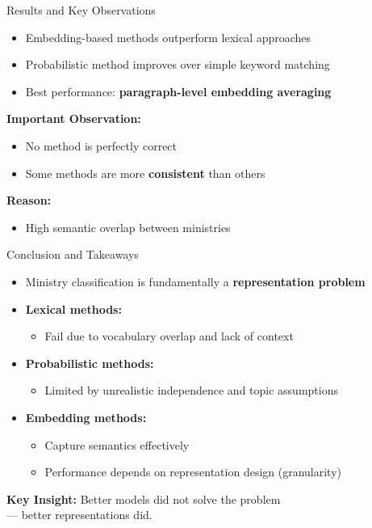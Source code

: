 \documentclass{beamer}
\begin{document}
\begin{frame}{Results and Key Observations}
\begin{itemize}
    \item Embedding-based methods outperform lexical approaches
    \item Probabilistic method improves over simple keyword matching
    \item Best performance: \textbf{paragraph-level embedding averaging}
\end{itemize}

\vspace{0.5em}

\textbf{Important Observation:}
\begin{itemize}
    \item No method is perfectly correct
    \item Some methods are more \textbf{consistent} than others
\end{itemize}

\vspace{0.5em}

\textbf{Reason:}
\begin{itemize}
    \item High semantic overlap between ministries
\end{itemize}
\end{frame}

\begin{frame}{Conclusion and Takeaways}
\begin{itemize}
    \item Ministry classification is fundamentally a \textbf{representation problem}
    
    \item \textbf{Lexical methods:}
    \begin{itemize}
        \item Fail due to vocabulary overlap and lack of context
    \end{itemize}
    
    \item \textbf{Probabilistic methods:}
    \begin{itemize}
        \item Limited by unrealistic independence and topic assumptions
    \end{itemize}
    
    \item \textbf{Embedding methods:}
    \begin{itemize}
        \item Capture semantics effectively
        \item Performance depends on representation design (granularity)
    \end{itemize}
\end{itemize}

\vspace{1em}

\textbf{Key Insight:} \centering Better models did not solve the problem \\ --- better representations did.
\end{frame}
\end{document}
